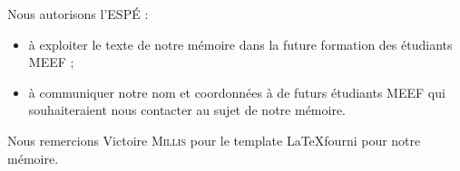 \begin{abstract}
\end{abstract}

Nous autorisons l'ESPÉ :
\begin{itemize}
\item à exploiter le texte de notre mémoire dans la future formation des étudiants MEEF ;
\item à communiquer notre nom et coordonnées à de futurs étudiants MEEF qui souhaiteraient
nous contacter au sujet de notre mémoire.
\end{itemize}

Nous remercions Victoire \textsc{Millis} pour le template \LaTeX fourni pour notre mémoire.
